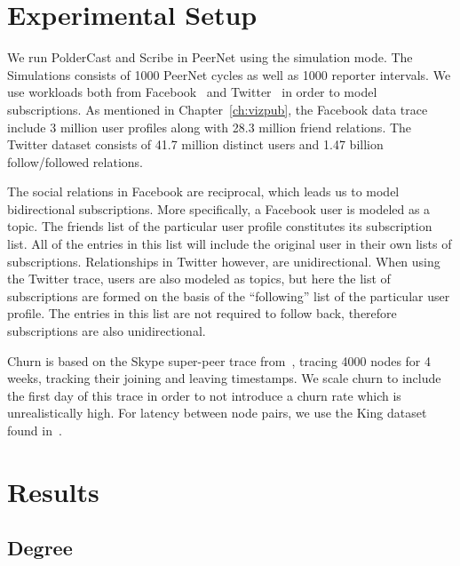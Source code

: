 \section{Experimental Setup}

We run PolderCast and Scribe in PeerNet using the simulation mode. The
Simulations consists of 1000 PeerNet cycles as well as 1000 reporter
intervals. We use workloads both from Facebook~\cite{facebook-eurosys09} and
Twitter~\cite{Kwak10www} in order to model subscriptions. As mentioned in
Chapter~\ref{ch:vizpub}, the Facebook data trace include 3 million user
profiles along with 28.3 million friend relations. The Twitter dataset
consists of 41.7 million distinct users and 1.47 billion
follow/followed relations.

The social relations in Facebook are reciprocal, which leads us to model
bidirectional subscriptions. More specifically, a Facebook user is
modeled as a topic. The friends list of the particular user profile
constitutes its subscription list. All of the entries in this list will
include the original user in their own lists of subscriptions.
Relationships in Twitter however, are unidirectional. When using the
Twitter trace, users are also modeled as topics, but here the list of
subscriptions are formed on the basis of the ``following'' list of the
particular  user profile. The entries in this list are not required to
follow back, therefore subscriptions are also unidirectional.

Churn is based on the Skype super-peer trace from~\cite{Guha:2006}, tracing 4000
nodes for 4 weeks, tracking their joining and leaving timestamps. We
scale churn to include the first day of this trace in order to not
introduce a churn rate which is unrealistically high. For latency
between node pairs, we use the King dataset found in~\cite{king}.

\section{Results}

\subsection{Degree}

